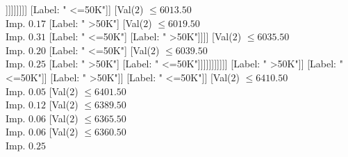 \documentclass[margin=10pt]{standalone}
\begin{document}
\begin{forest}
																																										[Val($2$) $ \leq 5953.50$ \\ Imp. $0.11$
																																											[Label: " >50K"]
																																											[Val($2$) $ \leq 5954.50$ \\ Imp. $0.09$
																																												[Label: " <=50K"]
																																												[Val($2$) $ \leq 5956.50$ \\ Imp. $0.14$
																																													[Label: " >50K"]
																																													[Val($2$) $ \leq 5972.50$ \\ Imp. $0.19$
																																														[Label: " <=50K"]
																																														[Val($2$) $ \leq 5973.50$ \\ Imp. $0.20$
																																															[Label: " >50K"]
																																															[Label: " <=50K"]]]]]]]]]
																																							[Label: " <=50K"]]
																																						[Val($2$) $ \leq 6013.50$ \\ Imp. $0.17$
																																							[Label: " >50K"]
																																							[Val($2$) $ \leq 6019.50$ \\ Imp. $0.31$
																																								[Label: " <=50K"]
																																								[Label: " >50K"]]]]
																																					[Val($2$) $ \leq 6035.50$ \\ Imp. $0.20$
																																						[Label: " <=50K"]
																																						[Val($2$) $ \leq 6039.50$ \\ Imp. $0.25$
																																							[Label: " >50K"]
																																							[Label: " <=50K"]]]]]]]]]]]
																													[Label: " >50K"]]
																												[Label: " <=50K"]]
																											[Label: " >50K"]]
																										[Label: " <=50K"]]
																									[Val($2$) $ \leq 6410.50$ \\ Imp. $0.05$
																										[Val($2$) $ \leq 6401.50$ \\ Imp. $0.12$
																											[Val($2$) $ \leq 6389.50$ \\ Imp. $0.06$
																												[Val($2$) $ \leq 6365.50$ \\ Imp. $0.06$
																													[Val($2$) $ \leq 6360.50$ \\ Imp. $0.25$

\end{forest}
\end{document}
